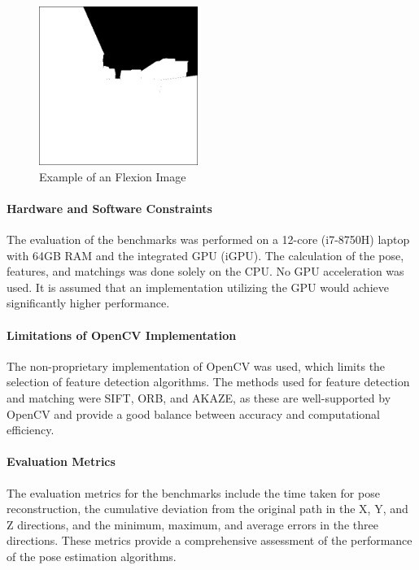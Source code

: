 \documentclass[conference, a4paper]{IEEEtran}
\begin{document}
\begin{figure}[h]
	\centering
	\includegraphics[width=0.46\textwidth]{pics/flexion.png}
	\caption{Example of an Flexion Image}
	\label{Pic2}
\end{figure}

\paragraph{Hardware and Software Constraints}
The evaluation of the benchmarks was performed on a 12-core (i7-8750H) laptop with 64GB RAM and the integrated GPU (iGPU). The calculation of the pose, features, and matchings was done solely on the CPU. No GPU acceleration was used. It is assumed that an implementation utilizing the GPU would achieve significantly higher performance.

\paragraph{Limitations of OpenCV Implementation}
The non-proprietary implementation of OpenCV was used, which limits the selection of feature detection algorithms. The methods used for feature detection and matching were SIFT, ORB, and AKAZE, as these are well-supported by OpenCV and provide a good balance between accuracy and computational efficiency.

\paragraph{Evaluation Metrics}
The evaluation metrics for the benchmarks include the time taken for pose reconstruction, the cumulative deviation from the original path in the X, Y, and Z directions, and the minimum, maximum, and average errors in the three directions. These metrics provide a comprehensive assessment of the performance of the pose estimation algorithms.
\end{document}
